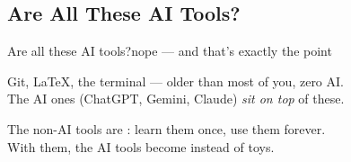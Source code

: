 \subsection{Are All These AI Tools?}

\begin{frame}{Are all these AI tools?}{nope --- and that's exactly the point}
    \begin{center}
        {\semiLARGE{}}
        \vspace{0.3cm}

        {\small\color{fgwhite} Git, \LaTeX, the terminal --- older than most of you, zero AI.\\
        The AI ones (ChatGPT, Gemini, Claude) \emph{sit on top} of these.}
    \end{center}
    \pause
    \begin{center}
        \begin{tcolorbox}[darkstyle,title={\tiny the point}]
            {\small The non-AI tools are : learn them once, use them forever.\\[0.15em]
             With them, the AI tools become  instead of toys.}
        \end{tcolorbox}
    \end{center}
\end{frame}
